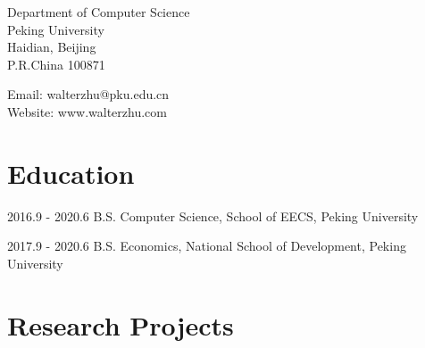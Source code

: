 \documentclass{academiccv}
\begin{document}
\raggedright


\vspace{1em}
\begin{minipage}[t]{0.495\textwidth}
  Department of Computer Science \\
 Peking University\\
  Haidian, Beijing\\
  P.R.China 100871
\end{minipage}
\begin{minipage}[t]{0.495\textwidth}
  Email: walterzhu@pku.edu.cn \\
  Website: www.walterzhu.com \\
\end{minipage}
\vspace{0.5em}


\section*{Education}

\begin{tablist}

\item[2016.9 - 2020.6]  \tab B.S. Computer Science, School of EECS, Peking University
\item[2017.9 - 2020.6]  \tab B.S. Economics, National School of Development, Peking University

\end{tablist}


\section*{Research Projects}
\end{document}
